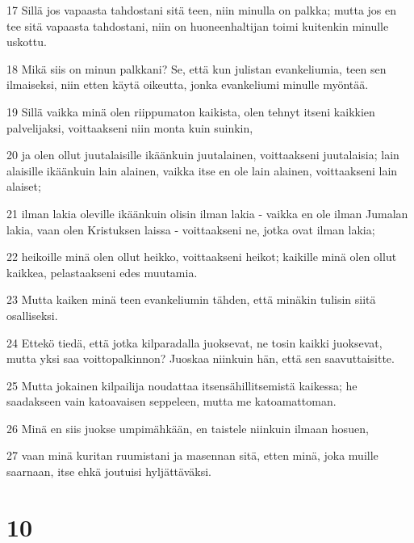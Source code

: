 \par 17 Sillä jos vapaasta tahdostani sitä teen, niin minulla on palkka; mutta jos en tee sitä vapaasta tahdostani, niin on huoneenhaltijan toimi kuitenkin minulle uskottu.
\par 18 Mikä siis on minun palkkani? Se, että kun julistan evankeliumia, teen sen ilmaiseksi, niin etten käytä oikeutta, jonka evankeliumi minulle myöntää.
\par 19 Sillä vaikka minä olen riippumaton kaikista, olen tehnyt itseni kaikkien palvelijaksi, voittaakseni niin monta kuin suinkin,
\par 20 ja olen ollut juutalaisille ikäänkuin juutalainen, voittaakseni juutalaisia; lain alaisille ikäänkuin lain alainen, vaikka itse en ole lain alainen, voittaakseni lain alaiset;
\par 21 ilman lakia oleville ikäänkuin olisin ilman lakia - vaikka en ole ilman Jumalan lakia, vaan olen Kristuksen laissa - voittaakseni ne, jotka ovat ilman lakia;
\par 22 heikoille minä olen ollut heikko, voittaakseni heikot; kaikille minä olen ollut kaikkea, pelastaakseni edes muutamia.
\par 23 Mutta kaiken minä teen evankeliumin tähden, että minäkin tulisin siitä osalliseksi.
\par 24 Ettekö tiedä, että jotka kilparadalla juoksevat, ne tosin kaikki juoksevat, mutta yksi saa voittopalkinnon? Juoskaa niinkuin hän, että sen saavuttaisitte.
\par 25 Mutta jokainen kilpailija noudattaa itsensähillitsemistä kaikessa; he saadakseen vain katoavaisen seppeleen, mutta me katoamattoman.
\par 26 Minä en siis juokse umpimähkään, en taistele niinkuin ilmaan hosuen,
\par 27 vaan minä kuritan ruumistani ja masennan sitä, etten minä, joka muille saarnaan, itse ehkä joutuisi hyljättäväksi.

\chapter{10}

